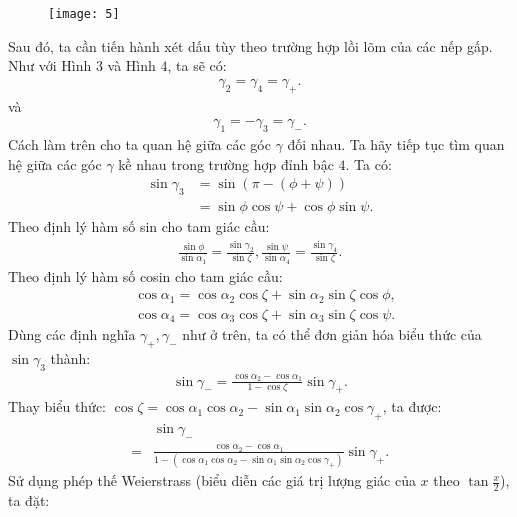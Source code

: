 \begin{multicols}{2}
		\begin{figure}[H]
	\vspace*{-5pt}
	\centering
	\captionsetup{labelformat= empty, justification=centering}
	\texttt{[image: 5]}
	\vspace*{-10pt}
\end{figure}
	Sau đó, ta cần tiến hành xét dấu tùy theo trường hợp lồi lõm của các nếp gấp. Như với Hình $3$ và Hình $4$, ta sẽ có:
	\begin{align*}
		\gamma_2 = \gamma_4 = \gamma_+.
	\end{align*}
	và
	\begin{align*}
		\gamma_1 = -\gamma_3 = \gamma_-.
	\end{align*}
	Cách làm trên cho ta quan hệ giữa các góc $\gamma$ đối nhau. Ta hãy tiếp tục tìm quan hệ giữa các góc $\gamma$ kề nhau trong trường hợp đỉnh bậc $4$. Ta có:
	\begin{align*}
		\sin \gamma_3 &= \sin \left(\pi - (\phi + \psi)\right) \\[-0.5ex]
		&= \sin\phi\cos\psi + \cos\phi \sin\psi.
	\end{align*}
	Theo định lý hàm số sin cho tam giác cầu:
	\begin{align*}
		\frac{\sin\phi}{\sin\alpha_1} = \frac{\sin\gamma_2}{\sin\zeta},\frac{\sin\psi}{\sin\alpha_4} = \frac{\sin \gamma_4}{\sin\zeta}.
	\end{align*}
	Theo định lý hàm số cosin cho tam giác cầu:
	\begin{align*}
		&\cos\alpha_1 = \cos\alpha_2\cos\zeta + \sin\alpha_2\sin\zeta\cos\phi,\\[-0.5ex] &\cos\alpha_4 = \cos\alpha_3\cos\zeta + \sin\alpha_3\sin\zeta\cos\psi.
	\end{align*}
	Dùng các định nghĩa $\gamma_+, \gamma_-$ như ở trên, ta có thể đơn giản hóa biểu thức của $\sin\gamma_3$ thành:
	\begin{align*}
		\sin\gamma_- = \frac{\cos\alpha_2 - \cos\alpha_1}{1 - \cos\zeta}\sin\gamma_+.
	\end{align*}
	Thay biểu thức: $\cos\zeta = \cos\alpha_1\cos\alpha_2 - \sin\alpha_1\sin\alpha_2\cos\gamma_+$,
	ta được:
	\begin{align*}
		&\sin\gamma_- \\[-0.5ex]
		= &\frac{\cos\alpha_2 \!-\! \cos\alpha_1}{1\!-\!\left(\!\cos\!\alpha_1\!\cos\!\alpha_2 \!-\! \sin\!\alpha_1\!\sin\!\alpha_2\!\cos\!\gamma_+\!\!\right)}\!\sin\gamma_+.
	\end{align*}
	Sử dụng phép thế Weierstrass (biểu diễn các giá trị lượng giác của $x$ theo $\tan\frac{x}{2}$), ta đặt:

\end{multicols}

